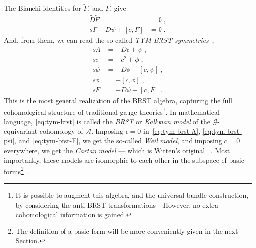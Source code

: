\documentclass[../main.tex]{subfiles}
\begin{document}
The Bianchi identities for $\tilde{F}$, and $F$, give
\begin{subequations}%
  \label{eq:universal-bianchi-identity}
  \begin{align}
    \tilde{D}\tilde{F}          & =0 \;,  \\
    sF+D\psi+ \left[c, F\right] & = 0 \;.
  \end{align}
\end{subequations}
And, from them, we can read the so-called \textit{TYM BRST symmetries}~\cite{baulieu1988a},
\begin{subequations}\label{eq:tym-brst}
  \begin{align}
    sA    & = -Dc + \psi \;,                     \label{eq:tym-brst-A}    \\
    sc    & = - c^2 + \phi \;,                   \label{eq:tym-brst-c}    \\
    s\psi & = -D\phi -  \left[c, \psi\right]  \;,\label{eq:tym-brst-psi}  \\
    s\phi & = - \left[ c, \phi \right]  \;,       \label{eq:tym-brst-phi} \\
    sF    & = -D\psi - \left[ c, F \right]  \label{eq:tym-brst-F} \;.
  \end{align}
\end{subequations}
This is the most general realization of the BRST algebra, capturing the full cohomological structure of traditional gauge theories\footnote{It is possible to augment this algebra, and the universal bundle construction, by considering the anti-BRST transformations~\cite{birmingham1991b,carvalho1992a,perry1993a}. However, no extra cohomological information is gained.}. In mathematical language,~\eqref{eq:tym-brst} is called the \emph{BRST} or \emph{Kalkman model} of the $\mathcal{G}$-equivariant cohomology of $\mathcal{A}$. Imposing $c=0$ in~\eqref{eq:tym-brst-A}, \eqref{eq:tym-brst-psi}, and~\eqref{eq:tym-brst-F}, we get the so-called \emph{Weil model}, and imposing $c=0$ everywhere, we get the \emph{Cartan model} --- which is Witten's original ~\cite{witten1988d,ouvry1989a,kanno1989a,kalkman1993a}. Most importantly, these models are isomorphic to each other in the subspace of basic forms\footnote{The definition of a basic form will be more conveniently given in the next Section.}~\cite{baal1990a,witten1991a,cordes1995a}. %
\end{document}
